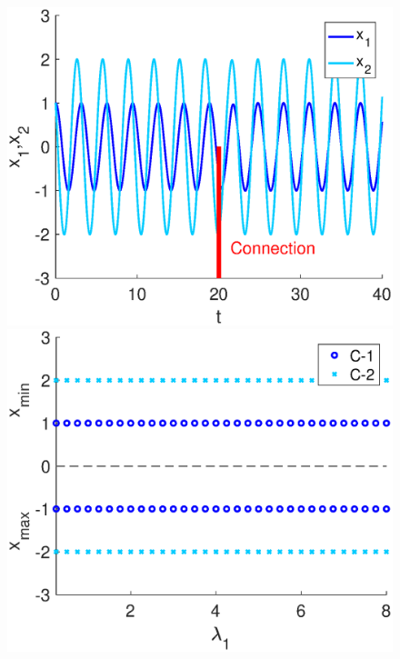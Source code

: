  \begin{figure}[htb]
        \begin{minipage}{0.32\linewidth}
            \begin{center}
                \includegraphics[width=1\linewidth]{Images/photo10_1.eps}
            \end{center}
        \end{minipage} 
        \begin{minipage}{0.32\linewidth}
            \begin{center}
                \includegraphics[width=1\linewidth]{Images/photo10_2.eps}

\end{center}
\end{minipage}
\end{figure}
